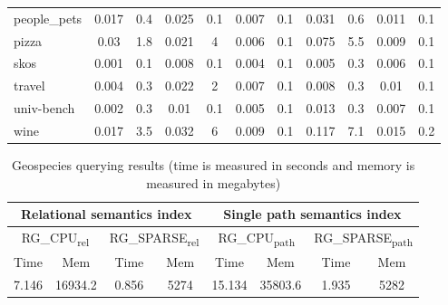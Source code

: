{\begin{table}[h]
\begin{tabular}{| l | c  c | c  c | c  c | c  c | c  c |}
people\_pets                & 0.017 & 0.4  & 0.025 & 0.1 & 0.007 & 0.1      & 0.031 & 0.6  & 0.011 & 0.1  \\
pizza                       & 0.03  & 1.8  & 0.021 & 4   & 0.006 & 0.1      & 0.075 & 5.5  & 0.009 & 0.1  \\
skos                        & 0.001 & 0.1  & 0.008 & 0.1 & 0.004 & 0.1      & 0.005 & 0.3  & 0.006 & 0.1  \\
travel                      & 0.004 & 0.3  & 0.022 & 2   & 0.007 & 0.1      & 0.008 & 0.3  & 0.01  & 0.1  \\
univ-bench                  & 0.002 & 0.3  & 0.01  & 0.1 & 0.005 & 0.1      & 0.013 & 0.3  & 0.007 & 0.1  \\
wine                        & 0.017 & 3.5  & 0.032 & 6   & 0.009 & 0.1      & 0.117 & 7.1  & 0.015 & 0.2  \\
    \hline
  \end{tabular}
\end{table}
}


{\setlength{\tabcolsep}{2pt}
\begin{table}[h]
\caption{Geospecies querying results (time is measured in seconds and memory is measured in megabytes)}
\label{tbl:tableGeospeciesResults}
\begin{tabular}{| c  c | c  c | c  c | c  c |}
    \hline

    \multicolumn{4}{|c|}{Relational semantics index}	&	\multicolumn{4}{|c|}{Single path semantics index} \\

    \hline


    \multicolumn{2}{|c|}{RG\_CPU\textsubscript{rel}}	&	\multicolumn{2}{|c|}{RG\_SPARSE\textsubscript{rel}} & \multicolumn{2}{|c|}{RG\_CPU\textsubscript{path}}	&	\multicolumn{2}{|c|}{RG\_SPARSE\textsubscript{path}}	 \\
    \hline
    Time & Mem & Time & Mem & Time & Mem & Time & Mem \\
    \hline
    \hline
    7.146 & 16934.2 & 0.856 & 5274 & 15.134 & 35803.6 & 1.935 & 5282   \\
    \hline
  \end{tabular}
\end{table}
}


